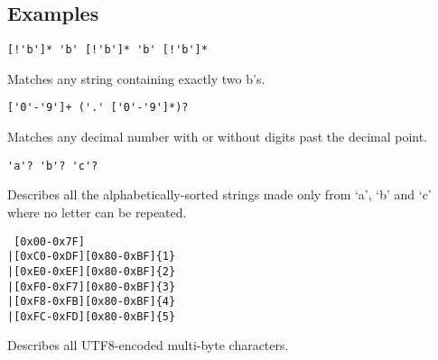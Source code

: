 
\subsection{Examples}
{
	\begin{itemize}
	{
		\item[] \lstinline[language=MAIA, columns=fixed]@[!'b']* 'b' [!'b']* 'b' [!'b']*@
		
			Matches any string containing exactly two b's.
		
		\item[] \lstinline[language=MAIA, columns=fixed]@['0'-'9']+ ('.' ['0'-'9']*)?@
		
			Matches any decimal number with or without digits
			past the decimal point.
		
		\item[] \lstinline[language=MAIA, columns=fixed]@'a'? 'b'? 'c'?@
		
			Describes all the alphabetically-sorted strings made only
			from `a', `b' and `c' where no letter can be repeated.
		
		\item[]
\begin{lstlisting}
 [0x00-0x7F]
|[0xC0-0xDF][0x80-0xBF]{1}
|[0xE0-0xEF][0x80-0xBF]{2}
|[0xF0-0xF7][0x80-0xBF]{3}
|[0xF8-0xFB][0x80-0xBF]{4}
|[0xFC-0xFD][0x80-0xBF]{5}
\end{lstlisting}
			Describes all UTF8-encoded multi-byte characters.
	}
	\end{itemize}
}
